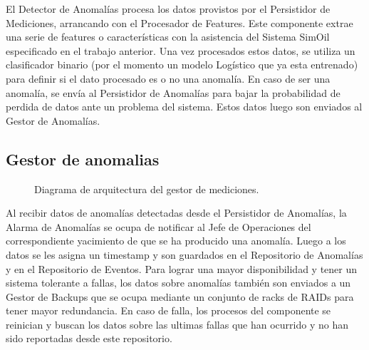 \documentclass{article}
\theoremstyle{definition}
\theoremstyle{remark}
\begin{document}
El Detector de Anomalías procesa los datos provistos por el Persistidor de Mediciones, arrancando con el Procesador de Features. Este componente extrae una serie de features o características con la asistencia del Sistema SimOil especificado en el trabajo anterior. Una vez procesados estos datos, se utiliza un clasificador binario (por el momento un modelo Logístico que ya esta entrenado) para definir si el dato procesado es o no una anomalía. En caso de ser una anomalía, se envía al Persistidor de Anomalías para bajar la probabilidad de perdida de datos ante un problema del sistema. Estos datos luego son enviados al Gestor de Anomalías.

\subsection{Gestor de anomalias} \label{gestor_anomalias}

\begin{figure}[H]
  \caption{Diagrama de arquitectura del gestor de mediciones.}
\end{figure}

Al recibir datos de anomalías detectadas desde el Persistidor de Anomalías, la Alarma de Anomalías se ocupa de notificar al Jefe de Operaciones del correspondiente yacimiento de que se ha producido una anomalía. Luego a los datos se les asigna un timestamp y son guardados en el Repositorio de Anomalías y en el Repositorio de Eventos. Para lograr una mayor disponibilidad y tener un sistema tolerante a fallas, los datos sobre anomalías también son enviados a un Gestor de Backups que se ocupa mediante un conjunto de racks de RAIDs para tener mayor redundancia. En caso de falla, los procesos del componente se reinician y buscan los datos sobre las ultimas fallas que han ocurrido y no han sido reportadas desde este repositorio.
\end{document}

